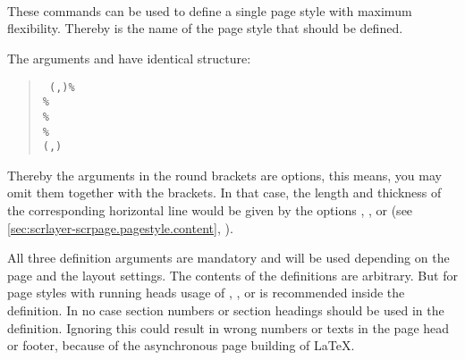 \begin{Declaration}
  \\
  \\
  \\
\end{Declaration}
%
%
%
%
These commands can be used to define a single page style with maximum
flexibility. Thereby  is the name of the page style that should
be defined.

The arguments  and  have
identical structure:
\begin{quote}\raggedright
  \texttt{%
    (,)\%\\
    \%\\
    \%\\
    \%\\
    (,)%
  }
\end{quote}
Thereby the arguments in the round brackets are options, this means, you may
omit them together with the brackets. In that case, the length and thickness
of the corresponding horizontal line would be given by the \KOMAScript{}
options , ,  or
 (see \autoref{sec:scrlayer-scrpage.pagestyle.content},
).

All three definition arguments are mandatory and will be used depending on the
page and the layout settings. The contents of the definitions are
arbitrary. But for page styles with running heads usage of ,
, or  is recommended inside the
definition. In no case section numbers or section headings should be used in
the definition. Ignoring this could result in wrong numbers or texts in the
page head or footer, because of the asynchronous page building of \LaTeX{}.

